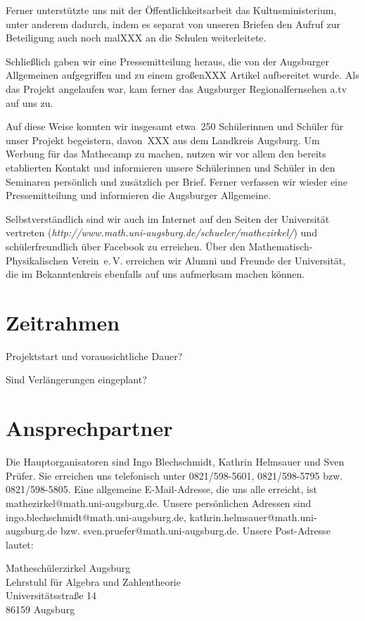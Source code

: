 \documentclass[12pt]{zettel}
\begin{document}
Ferner unterstützte uns mit der Öffentlichkeitsarbeit das Kultusministerium,
unter anderem dadurch, indem es separat von unseren Briefen den Aufruf zur
Beteiligung auch noch malXXX an die Schulen weiterleitete.

Schließlich gaben wir eine Pressemitteilung heraus, die von der
Augsburger Allgemeinen aufgegriffen und zu einem großenXXX Artikel aufbereitet
wurde. Als das Projekt angelaufen war, kam ferner das Augsburger
Regionalfernsehen a.tv auf uns zu.

Auf diese Weise konnten wir insgesamt etwa~250 Schülerinnen und Schüler für
unser Projekt begeistern, davon~XXX aus dem Landkreis Augsburg. Um Werbung für
das Mathecamp zu machen, nutzen wir vor allem den bereits etablierten Kontakt
und informieren unsere Schülerinnen und Schüler in den Seminaren persönlich und
zusätzlich per Brief. Ferner verfassen wir wieder eine Pressemitteilung und
informieren die Augsburger Allgemeine.

Selbstverständlich sind wir auch im Internet auf den Seiten der Universität
vertreten (\textsl{http:/\!/www.math.uni-augsburg.de/schueler/mathezirkel/})
und schülerfreundlich über Facebook zu erreichen. Über den
Mathematisch-Physikalischen Verein~e.\,V. erreichen wir Alumni und Freunde der
Universität, die im Bekanntenkreis ebenfalls auf uns aufmerksam machen können.


\section{Zeitrahmen}

Projektstart und voraussichtliche Dauer?

Sind
Verlängerungen
eingeplant?


\section{Ansprechpartner}

Die Hauptorganisatoren sind Ingo Blechschmidt, Kathrin Helmsauer und Sven
Prüfer. Sie erreichen uns telefonisch unter 0821/598-5601, 0821/598-5795 bzw.
0821/598-5805. Eine allgemeine E-Mail-Adresse, die uns alle erreicht, ist
\textsf{mathezirkel@math.uni-augsburg.de}. Unsere persönlichen Adressen sind
\textsf{ingo.blechschmidt@math.uni-augsburg.de},
\textsf{kathrin.helmsauer@math.uni-augsburg.de} bzw.
\textsf{sven.pruefer@math.uni-augsburg.de}. Unsere Post-Adresse lautet:

\begin{tabbing}
  Matheschülerzirkel Augsburg \\
  Lehrstuhl für Algebra und Zahlentheorie \\
  Universitätsstraße 14 \\
  86159 Augsburg
\end{tabbing}
\end{document}
